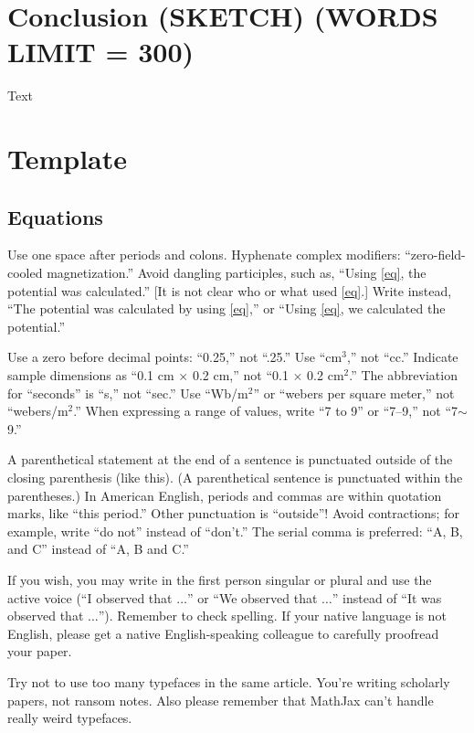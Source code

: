 \documentclass[journal,twoside,web]{ieeecolor2}
\begin{document}
\section{Conclusion (SKETCH) (WORDS LIMIT = 300)}
Text

\section{Template}

\subsection{Equations}
Use one space after periods and colons. Hyphenate complex modifiers: 
``zero-field-cooled magnetization.'' Avoid dangling participles, such as, 
``Using \eqref{eq}, the potential was calculated.'' [It is not clear who or what 
used \eqref{eq}.] Write instead, ``The potential was calculated by using \eqref{eq},'' or 
``Using \eqref{eq}, we calculated the potential.''

Use a zero before decimal points: ``0.25,'' not ``.25.'' Use 
``cm$^{3}$,'' not ``cc.'' Indicate sample dimensions as ``0.1 cm 
$\times $ 0.2 cm,'' not ``0.1 $\times $ 0.2 cm$^{2}$.'' The 
abbreviation for ``seconds'' is ``s,'' not ``sec.'' Use 
``Wb/m$^{2}$'' or ``webers per square meter,'' not 
``webers/m$^{2}$.'' When expressing a range of values, write ``7 to 
9'' or ``7--9,'' not ``7$\sim $9.''

A parenthetical statement at the end of a sentence is punctuated outside of 
the closing parenthesis (like this). (A parenthetical sentence is punctuated 
within the parentheses.) In American English, periods and commas are within 
quotation marks, like ``this period.'' Other punctuation is ``outside''! 
Avoid contractions; for example, write ``do not'' instead of ``don't.'' The 
serial comma is preferred: ``A, B, and C'' instead of ``A, B and C.''

If you wish, you may write in the first person singular or plural and use 
the active voice (``I observed that $\ldots$'' or ``We observed that $\ldots$'' 
instead of ``It was observed that $\ldots$''). Remember to check spelling. If 
your native language is not English, please get a native English-speaking 
colleague to carefully proofread your paper.

Try not to use too many typefaces in the same article. You're writing
scholarly papers, not ransom notes. Also please remember that MathJax
can't handle really weird typefaces.
\end{document}
